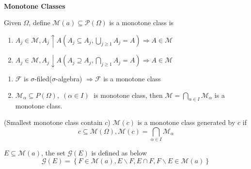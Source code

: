 \setcounter{lecture}{5}
\begin{center}
	\Large \bf  Monotone Classes
\end{center}
\vspace{0.25cm}

\begin{definition}
	Given $ \Omega $, define $ \mathcal{M}\left(a\right) \subseteq \mathcal{P}(\Omega) $ is a monotone class is 
	\begin{enumerate}
		\item $ {A_j} \in \mathcal{M},{A_j} \uparrow A\left( {{A_j} \subseteq {A_j},\bigcup\limits_{j \geqslant 1} {{A_j}}  = A} \right) \Rightarrow A \in \mathcal{M} $
		\item ${A_j} \in \mathcal{M},{A_j} \downarrow A\left( {{A_j} \supseteq {A_j},\bigcap\limits_{j \geqslant 1} {{A_j}}  = A} \right) \Rightarrow A \in \mathcal{M}$
	\end{enumerate}
   \label{def5.1}
\end{definition}
 
\begin{remark}
	\text{}
	\begin{enumerate}
		\item $ \mathcal{F} $ is $ \sigma $-filed($ \sigma $-algebra) $ \Rightarrow \mathcal{F}$ is a monotone class
		\item  ${\mathcal{M}_\alpha } \subseteq P\left( \Omega  \right),\;\left( {\alpha  \in I} \right)\;$ is monotone class, then $ \mathcal{M}= \bigcap\limits_{\alpha  \in I} {{\mathcal{M}_\alpha }} $ is a monotone class.
	\end{enumerate}
	\label{rmk5.1}
\end{remark}

\begin{notation}(Smallest monotone class contain $ c $)
	$ \mathcal{M}(c) $ is  a monotone class generated by $ c $ if 
	\begin{equation}
	c \subseteq \mathcal{M}(\Omega), \mathcal{M}\left( c \right) = \bigcap\limits_{\alpha  \in I} {{\mathcal{M}_\alpha }} 
	\label{eq5.1}
	\end{equation}
	\label{not5.1}
\end{notation}

\begin{definition}
	$ E \subseteq \mathcal{M}(a) $, the set $ \mathcal{G}(E) $ is defined as below %
	\begin{equation}
	\mathcal{G}\left( E \right) = \left\{ {F \in \mathcal{M}\left( a \right),E\backslash F,E \cap F,F\backslash E \in \mathcal{M}\left( a \right)} \right\}
	\label{eq5.2}
	\end{equation}
	\label{def5.2}
\end{definition}

